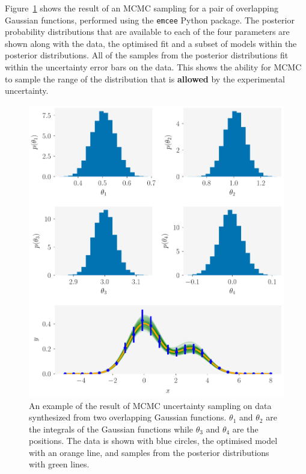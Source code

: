 \documentclass[twoside,symmetric]{tufte-handout}
\begin{document}
Figure~\ref{fig:mcmc} shows the result of an MCMC sampling for a pair of overlapping Gaussian functions, performed using the \texttt{emcee} Python package.\cite{foremanmackey_emcee_2012}
The posterior probability distributions that are available to each of the four parameters are shown along with the data, the optimised fit and a subset of models within the posterior distributions. 
All of the samples from the posterior distributions fit within the uncertainty error bars on the data.
This shows the ability for MCMC to sample the range of the distribution that is \textbf{allowed} by the experimental uncertainty. 
%
\begin{figure}
    \includegraphics[width=\textwidth]{mcmc}
    \caption{An example of the result of MCMC uncertainty sampling on data synthesized from two overlapping Gaussian functions. $\theta_1$ and $\theta_2$ are the integrals of the Gaussian functions while $\theta_3$ and $\theta_4$ are the positions. The data is shown with blue circles, the optimised model with an orange line, and samples from the posterior distributions with green lines.}
    \label{fig:mcmc}
\end{figure}
%
\end{document}
